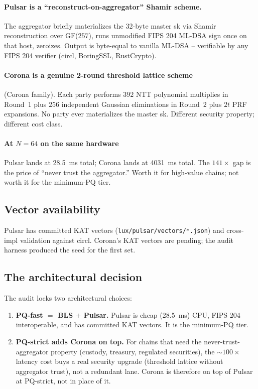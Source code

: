 \paragraph{Pulsar is a ``reconstruct-on-aggregator'' Shamir scheme.}
The aggregator briefly materializes the 32-byte master sk via
Shamir reconstruction over GF($257$), runs unmodified FIPS 204
ML-DSA sign once on that host, zeroizes. Output is byte-equal to
vanilla ML-DSA -- verifiable by any FIPS 204 verifier (circl,
BoringSSL, RustCrypto). \cite{fips204}

\paragraph{Corona is a genuine 2-round threshold lattice scheme}
(Corona family). Each party performs $392$
NTT polynomial multiplies in Round~1 plus $256$ independent
Gaussian eliminations in Round~2 plus $2t$ PRF expansions. No party
ever materializes the master sk. Different security property;
different cost class.

\paragraph{At $N{=}64$ on the same hardware} Pulsar lands at
\SI{28.5}{\milli\second} total; Corona lands at \SI{4031}{\milli\second}
total. The $141\times$ gap is the price of ``never trust the
aggregator.'' Worth it for high-value chains; not worth it for the
minimum-PQ tier.

\subsection{Vector availability}

Pulsar has committed KAT vectors (\texttt{lux/pulsar/vectors/*.json})
and cross-impl validation against circl. Corona's KAT vectors are
pending; the audit harness produced the seed for the first set.

\subsection{The architectural decision}

The audit locks two architectural choices:

\begin{enumerate}[leftmargin=2em,nosep]
\item \textbf{PQ-fast $=$ BLS $+$ Pulsar.} Pulsar is cheap (\SI{28.5}{\milli\second})
  CPU, FIPS 204 interoperable, and has committed KAT vectors. It is
  the minimum-PQ tier.
\item \textbf{PQ-strict adds Corona on top.} For chains that need
  the never-trust-aggregator property (custody, treasury, regulated
  securities), the $\sim 100\times$ latency cost buys a real
  security upgrade (threshold lattice without aggregator trust),
  not a redundant lane. Corona is therefore on top of Pulsar at
  PQ-strict, not in place of it.
\end{enumerate}

